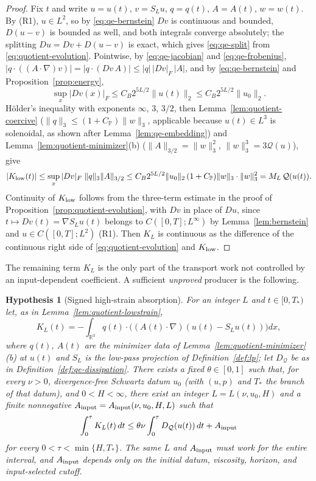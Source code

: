 \documentclass[11pt]{article}
\newtheorem{hypothesis}[theorem]{Hypothesis}
\theoremstyle{definition}
\theoremstyle{plain}
\newcommand{\R}{\mathbb R}
\newcommand{\norm}[1]{\lVert #1\rVert}
\begin{document}
\begin{proof}
Fix $t$ and write $u=u(t)$, $v=S_Lu$, $q=q(t)$, $A=A(t)$, $w=w(t)$.  By
(R1), $u\in L^2$, so by \eqref{eq:qe-bernstein} $Dv$ is continuous and
bounded, $D(u-v)$ is bounded as well, and both integrals converge
absolutely; the splitting $Du=Dv+D(u-v)$ is exact, which gives
\eqref{eq:qe-split} from \eqref{eq:quotient-evolution}.  Pointwise, by
\eqref{eq:qe-jacobian} and \eqref{eq:qe-frobenius},
$|q\cdot((A\cdot\nabla)v)|=|q\cdot(Dv\,A)|\le|q|\,|Dv|_F\,|A|$, and by
\eqref{eq:qe-bernstein} and Proposition~\ref{prop:energy},
\[
 \sup_x|Dv(x)|_F\le C_B2^{5L/2}\norm{u(t)}_2\le C_B2^{5L/2}\norm{u_0}_2 .
\]
H\"older's inequality with exponents $\infty$, $3$, $3/2$, then
Lemma~\ref{lem:quotient-coercive} ($\norm q_3\le(1+C_{\mathbb P})\norm w_3$,
applicable because $u(t)\in L^3$ is solenoidal, as shown after
Lemma~\ref{lem:qe-embedding}) and
Lemma~\ref{lem:quotient-minimizer}(b) ($\norm A_{3/2}=\norm w_3^2$,
$\norm w_3^3=3\mathcal Q(u)$), give
\[
 |K_{\rm low}(t)|
 \le\sup_x|Dv|_F\;\norm q_3\norm A_{3/2}
 \le C_B2^{5L/2}\norm{u_0}_2\,(1+C_{\mathbb P})\norm w_3\cdot\norm w_3^2
 =M_L\,\mathcal Q(u(t)) .
\]
Continuity of $K_{\rm low}$ follows from the three-term estimate in the
proof of Proposition~\ref{prop:quotient-evolution}, with $Dv$ in place of
$Du$, since $t\mapsto Dv(t)=\nabla S_Lu(t)$ belongs to $C([0,T];L^\infty)$
by Lemma~\ref{lem:bernstein} and $u\in C([0,T];L^2)$ (R1).  Then $K_L$ is
continuous as the difference of the continuous right side of
\eqref{eq:quotient-evolution} and $K_{\rm low}$.
\end{proof}

The remaining term $K_L$ is the only part of the transport work not
controlled by an input-dependent coefficient.  A sufficient
\emph{unproved} producer is the following.

\begin{hypothesis}[Signed high-strain absorption]\label{hyp:highstrain}
For an integer $L$ and $t\in[0,T_*)$ let, as in
Lemma~\ref{lem:quotient-lowstrain},
\[
 K_L(t)=-\int_{\R^3}q(t)\cdot\bigl((A(t)\cdot\nabla)(u(t)-S_Lu(t))\bigr)dx ,
\]
where $q(t)$, $A(t)$ are the minimizer data of
Lemma~\ref{lem:quotient-minimizer}(b) at $u(t)$ and $S_L$ is the low-pass
projection of Definition~\ref{def:lp}; let $D_{\mathcal Q}$ be as in
Definition~\ref{def:qe-dissipation}.  There exists a fixed
$\theta\in[0,1]$ such that, for every $\nu>0$, divergence-free Schwartz
datum $u_0$ (with $(u,p)$ and $T_*$ the branch of that datum), and
$0<H<\infty$, there exist an integer $L=L(\nu,u_0,H)$ and
a finite nonnegative $A_{\rm input}=A_{\rm input}(\nu,u_0,H,L)$ such that
\begin{equation}\label{eq:quotient-gap}
 \int_0^\tau K_L(t)\,dt
 \le\theta\nu\int_0^\tau D_{\mathcal Q}(u(t))\,dt+A_{\rm input}
\end{equation}
for every $0<\tau<\min\{H,T_*\}$.  The same $L$ and $A_{\rm input}$ must
work for the entire interval, and $A_{\rm input}$ depends only on the
initial datum, viscosity, horizon, and input-selected cutoff.
\end{hypothesis}
\end{document}
